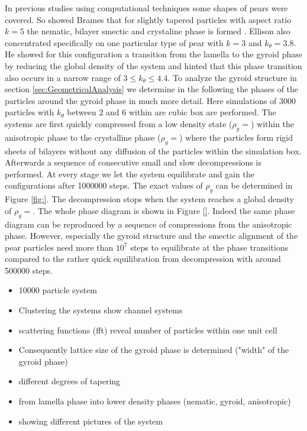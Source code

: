 \documentclass[epj,twocolumn]{webofc}
\begin{document}
In previous studies using computational techniques some shapes of pears were covered. So showed Brames that for slightly tapered particles with aspect ratio $k=5$ the nematic, bilayer smectic and crystaline phase is formed 
\cite{}. Ellison also concentrated specifically on one particular type of pear with $k=3$ and $k_{\theta}=3.8$. He showed for this configuration a transition from the lamella to the gyroid phase by reducing the global density of the 
system and hinted that this phase transition also occurs in a narrow range of $3\leq k_{\theta}\leq 4.4$. To analyze the gyroid structure in section \ref{sec:GeometricalAnalysis} we determine in the following the phases of the
particles around the gyroid phase in much more detail. Here simulations of 3000 particles with $k_{\theta}$ between $2$ and $6$ within are cubic box are performed. The systems are first quickly compressed from a low density 
state ($\rho_g=$) within the anisotropic phase to the crystalline phase ($\rho_g=$) where the particles form rigid sheets of bilayers without any diffusion of the particles within the simulation box. Afterwards a sequence of 
consecutive small and slow decompressions is performed. At every stage we let the system equilibrate and gain the configurations after 1000000 steps. The exact values of $\rho_g$ can be determined in Figure \ref{fig:}. The 
decompression stops when the system reaches a global density of $\rho_g=$. The whole phase diagram is shown in Figure \ref{}. Indeed the same phase diagram can be reproduced by a sequence of compressions from the 
anisotropic phase. However, especially the gyroid structure and the smectic alignment of the pear particles need more than $10^7$ steps to equilibrate at the phase transitions compared to the rather quick equilibration from decompression with around 500000 steps. 

\begin{itemize}
    \item 10000 particle system
    \item Clustering the systems show channel systems
    \item scattering functions (fft) reveal number of particles within one unit cell
    \item Consequently lattice size of the gyroid phase is determined ("width" of the gyroid phase)
\end{itemize}

\begin{itemize}
    \item different degrees of tapering
    \item from lamella phase into lower density phases (nematic, gyroid, anisotropic)
    \item showing different pictures of the system
\end{itemize}
\end{document}
